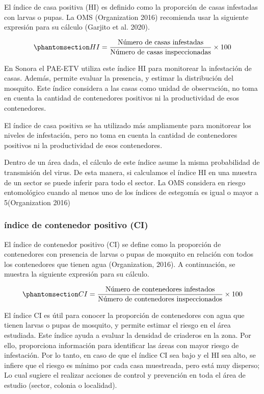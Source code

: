 \documentclass[
  letterpaper,
  twocolumn,
  landscape]{report}
\begin{document}
El índice de casa positiva (HI) es definido como la proporción de casas
infestadas con larvas o pupas. La OMS (Organization 2016) recomienda
usar la siguiente expresión para su cálculo (Garjito et al. 2020).

\begin{equation}\phantomsection\label{eq-hi-index}{         
  HI = \frac{
   \text{Número de casas infestadas}
  }{
    \text{Número de casas inspeccionadas}
  } \times 100
}\end{equation}

En Sonora el PAE-ETV utiliza este índice HI para monitorear la
infestación de casas. Además, permite evaluar la presencia, y estimar la
distribución del mosquito. Este índice considera a las casas como unidad
de observación, no toma en cuenta la cantidad de contenedores positivos
ni la productividad de esos contenedores.

El índice de casa positiva se ha utilizado más ampliamente para
monitorear los niveles de infestación, pero no toma en cuenta la
cantidad de contenedores positivos ni la productividad de esos
contenedores.

Dentro de un área dada, el cálculo de este índice asume la misma
probabilidad de transmisión del virus. De esta manera, si calculamos el
índice HI en una muestra de un sector se puede inferir para todo el
sector. La OMS considera en riesgo entomológico cuando al menos uno de
los índices de estegomía es igual o mayor a 5(Organization 2016)

\subsubsection*{índice de contenedor positivo
(CI)}\label{uxedndice-de-contenedor-positivo-ci}

El índice de contenedor positivo (CI) se define como la proporción de
contenedores con presencia de larvas o pupas de mosquito en relación con
todos los contenedores que tienen agua (Organization, 2016). A
continuación, se muestra la siguiente expresión para su cálculo.

\begin{equation}\phantomsection\label{eq-ci-index}{         
  CI = \frac{
   \text{Número de contenedores infestados}
  }{
    \text{Número de contenedores inspeccionados}
  } \times 100
}\end{equation}

El índice CI es útil para conocer la proporción de contenedores con agua
que tienen larvas o pupas de mosquito, y permite estimar el riesgo en el
área estudiada. Este índice ayuda a evaluar la densidad de criaderos en
la zona. Por ello, proporciona información para identificar las áreas
con mayor riesgo de infestación. Por lo tanto, en caso de que el índice
CI sea bajo y el HI sea alto, se infiere que el riesgo es mínimo por
cada casa muestreada, pero está muy disperso; Lo cual sugiere el
realizar acciones de control y prevención en toda el área de estudio
(sector, colonia o localidad).
\end{document}
